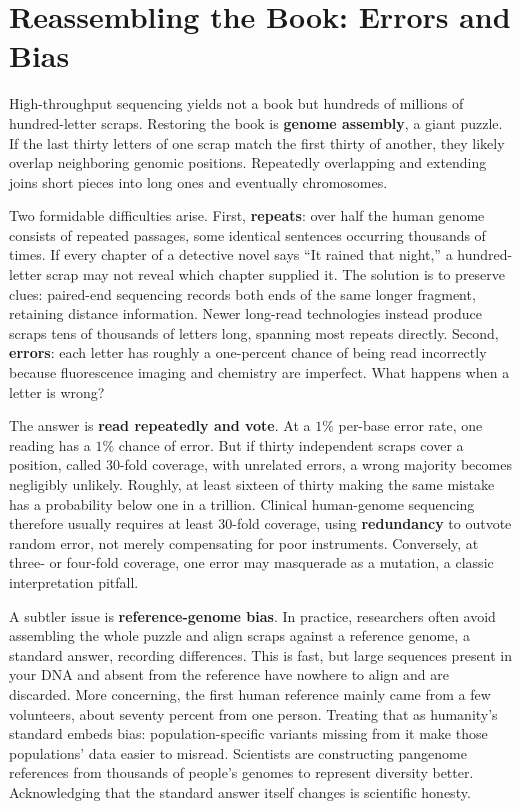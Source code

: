 \section{Reassembling the Book: Errors and Bias}

High-throughput sequencing yields not a book but hundreds of millions of hundred-letter scraps. Restoring the book is \textbf{genome assembly}, a giant puzzle. If the last thirty letters of one scrap match the first thirty of another, they likely overlap neighboring genomic positions. Repeatedly overlapping and extending joins short pieces into long ones and eventually chromosomes.

Two formidable difficulties arise. First, \textbf{repeats}: over half the human genome consists of repeated passages, some identical sentences occurring thousands of times. If every chapter of a detective novel says ``It rained that night,'' a hundred-letter scrap may not reveal which chapter supplied it. The solution is to preserve clues: paired-end sequencing records both ends of the same longer fragment, retaining distance information. Newer long-read technologies instead produce scraps tens of thousands of letters long, spanning most repeats directly. Second, \textbf{errors}: each letter has roughly a one-percent chance of being read incorrectly because fluorescence imaging and chemistry are imperfect. What happens when a letter is wrong?

\begin{qiaoliang}
The answer is \textbf{read repeatedly and vote}. At a $1\%$ per-base error rate, one reading has a $1\%$ chance of error. But if thirty independent scraps cover a position, called 30-fold coverage, with unrelated errors, a wrong majority becomes negligibly unlikely. Roughly, at least sixteen of thirty making the same mistake has a probability below one in a trillion. Clinical human-genome sequencing therefore usually requires at least 30-fold coverage, using \textbf{redundancy} to outvote random error, not merely compensating for poor instruments. Conversely, at three- or four-fold coverage, one error may masquerade as a mutation, a classic interpretation pitfall.
\end{qiaoliang}

A subtler issue is \textbf{reference-genome bias}. In practice, researchers often avoid assembling the whole puzzle and align scraps against a reference genome, a standard answer, recording differences. This is fast, but large sequences present in your DNA and absent from the reference have nowhere to align and are discarded. More concerning, the first human reference mainly came from a few volunteers, about seventy percent from one person. Treating that as humanity's standard embeds bias: population-specific variants missing from it make those populations' data easier to misread. Scientists are constructing pangenome references from thousands of people's genomes to represent diversity better. Acknowledging that the standard answer itself changes is scientific honesty.

